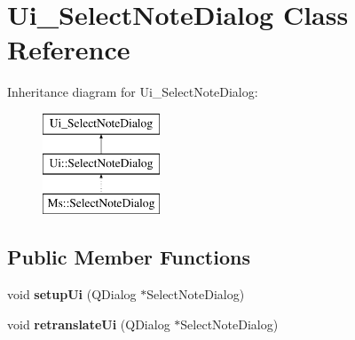 \hypertarget{class_ui___select_note_dialog}{}\section{Ui\+\_\+\+Select\+Note\+Dialog Class Reference}
\label{class_ui___select_note_dialog}
Inheritance diagram for Ui\+\_\+\+Select\+Note\+Dialog\+:\begin{figure}[H]
\begin{center}
\leavevmode
\includegraphics[height=3.000000cm]{class_ui___select_note_dialog}
\end{center}
\end{figure}
\subsection*{Public Member Functions}
\begin{DoxyCompactItemize}
\item 
\mbox{\label{class_ui___select_note_dialog_aacdfdef4790f018acc41599bfd06c99a}} 
void {\bfseries setup\+Ui} (Q\+Dialog $\ast$Select\+Note\+Dialog)
\item 
\mbox{\label{class_ui___select_note_dialog_a4edca4b06508c750ff3983f3009727ce}} 
void {\bfseries retranslate\+Ui} (Q\+Dialog $\ast$Select\+Note\+Dialog)
\end{DoxyCompactItemize}
